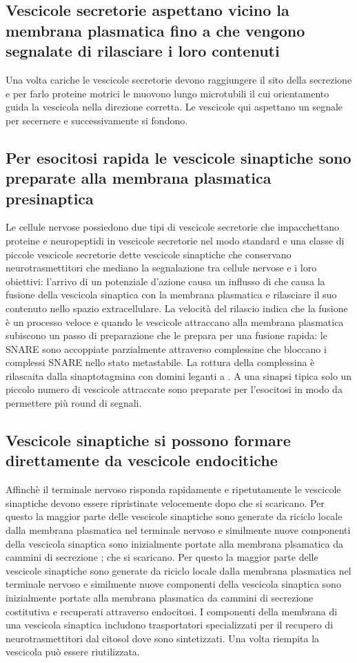 \subsection{Vescicole secretorie aspettano vicino la membrana plasmatica fino a che vengono segnalate di rilasciare i loro contenuti}
Una volta cariche le vescicole secretorie devono raggiungere il sito della secrezione e per farlo proteine motrici le muovono lungo microtubili il cui orientamento guida la vescicola
nella direzione corretta. Le vescicole qui aspettano un segnale per secernere e successivamente si fondono.
\subsection{Per esocitosi rapida le vescicole sinaptiche sono preparate alla membrana plasmatica presinaptica}
Le cellule nervose possiedono due tipi di vescicole secretorie che impacchettano proteine e neuropeptidi in vescicole secretorie nel modo standard e una classe di piccole vescicole 
secretorie dette vescicole sinaptiche che conservano neurotrasmettitori che mediano la segnalazione tra cellule nervose e i loro obiettivi: l'arrivo di un potenziale d'azione causa
un influsso di  che causa la fusione della vescicola sinaptica con la membrana plasmatica e rilasciare il suo contenuto nello spazio extracellulare. La velocit\`a del 
rilascio indica che la fusione \`e un processo veloce e quando le vescicole attraccano alla membrana plasmatica subiscono un passo di preparazione che le prepara per una fusione rapida:
le SNARE sono accoppiate parzialmente attraverso complessine che bloccano i complessi SNARE nello stato metastabile. La rottura della complessina \`e rilascaita dalla sinaptotagmina
con domini leganti a . A una sinapsi tipica solo un piccolo numero di vescicole attraccate sono preparate per l'esocitosi in modo da permettere pi\`u round di segnali.
\subsection{Vescicole sinaptiche si possono formare direttamente da vescicole endocitiche}
Affinch\`e il terminale nervoso risponda rapidamente e ripetutamente le vescicole sinaptiche devono essere ripristinate velocemente dopo che si scaricano. Per questo la maggior parte 
delle vescicole sinaptiche sono generate da riciclo locale dalla membrana plasmatica nel terminale nervoso e similmente nuove componenti della vescicola sinaptica sono inizialmente 
portate alla membrana plsamatica da cammini di secrezione ; che si scaricano. Per questo la maggior parte 
delle vescicole sinaptiche sono generate da riciclo locale dalla membrana plasmatica nel terminale nervoso e similmente nuove componenti della vescicola sinaptica sono inizialmente 
portate alla membrana plasmatica da cammini di secrezione  costitutiva e recuperati attraverso endocitosi. I componenti della membrana di una vescicola sinaptica includono trasportatori
specializzati per il recupero di neurotrasmettitori dal citosol dove sono sintetizzati. Una volta riempita la vescicola pu\`o essere riutilizzata. 
